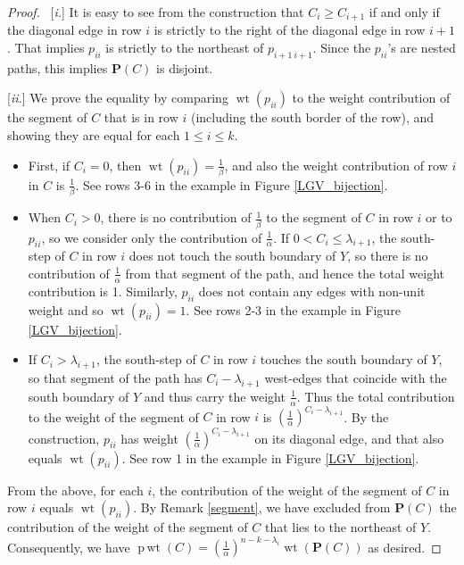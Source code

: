 \documentclass[11pt]{article}
\numberwithin{equation}{section}
\theoremstyle{plain}
\theoremstyle{definition}
\theoremstyle{remark}
\DeclareMathOperator{\wt}{wt}
\DeclareMathOperator{\pwt}{p\,wt}
\begin{document}
\begin{proof}\ [\textit{i.}] It is easy to see from the construction that $C_i \geq C_{i+1}$ if and only if the diagonal edge in row $i$ is strictly to the right of the diagonal edge in row $i+1$. That implies $p_{ii}$ is strictly to the northeast of $p_{i+1\ i+1}$. Since the $p_{ii}$'s are nested paths, this implies $\textbf{P}(C)$ is disjoint.

[\textit{ii.}] We prove the equality by comparing  $\wt(p_{ii})$ to the weight contribution of the segment of $C$ that is in row $i$ (including the south border of the row), and showing they are equal for each $1 \leq i \leq k$. 
\begin{itemize}
\item First, if $C_i=0$, then $\wt(p_{ii})=\frac{1}{\beta}$, and also the weight contribution of row $i$ in $C$ is $\frac{1}{\beta}$. See rows 3-6 in the example in Figure \ref{LGV_bijection}.

\item When $C_i>0$, there is no contribution of $\frac{1}{\beta}$ to the segment of $C$ in row $i$ or to $p_{ii}$, so we consider only the contribution of $\frac{1}{\alpha}$. If $0 < C_i \leq \lambda_{i+1}$, the south-step of $C$ in row $i$ does not touch the south boundary of $Y$, so there is no contribution of $\frac{1}{\alpha}$ from that segment of the path, and hence the total weight contribution is 1. Similarly, $p_{ii}$ does not contain any edges with non-unit weight and so $\wt(p_{ii})=1$. See rows 2-3 in the example in Figure \ref{LGV_bijection}.

\item If $C_i>\lambda_{i+1}$, the south-step of $C$ in row $i$ touches the south boundary of $Y$, so that segment of the path has $C_i-\lambda_{i+1}$ west-edges that coincide with the south boundary of $Y$ and thus carry the weight $\frac{1}{\alpha}$. Thus the total contribution to the weight of the segment of $C$ in row $i$ is $\left(\frac{1}{\alpha}\right)^{C_i - \lambda_{i+1}}$. By the construction, $p_{ii}$ has weight $\left(\frac{1}{\alpha}\right)^{C_i - \lambda_{i+1}}$ on its diagonal edge, and that also equals $\wt(p_{ii})$. See row 1 in the example in Figure \ref{LGV_bijection}.
\end{itemize}
From the above, for each $i$, the contribution of the weight of the segment of $C$ in row $i$ equals $\wt(p_{ii})$. By Remark \ref{segment}, we have excluded from $\textbf{P}(C)$ the contribution of the weight of the segment of $C$ that lies to the northeast of $Y$. Consequently, we have $\pwt(C)=\left(\frac{1}{\alpha}\right)^{n-k-\lambda_i}\wt(\textbf{P}(C))$ as desired.
\end{proof}
\end{document}
